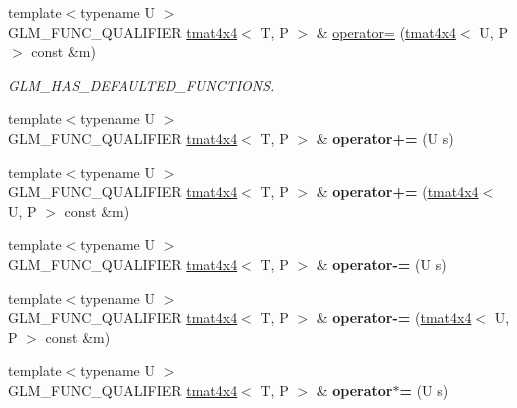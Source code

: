 \begin{DoxyCompactItemize}
{\footnotesize template$<$typename U $>$ }\\G\+L\+M\+\_\+\+F\+U\+N\+C\+\_\+\+Q\+U\+A\+L\+I\+F\+I\+ER \hyperlink{structglm_1_1tmat4x4}{tmat4x4}$<$ T, P $>$ \& \hyperlink{structglm_1_1tmat4x4_a967c1c1711875b670d5a325d86566209}{operator=} (\hyperlink{structglm_1_1tmat4x4}{tmat4x4}$<$ U, P $>$ const \&m)
\begin{DoxyCompactList}\small\item\em G\+L\+M\+\_\+\+H\+A\+S\+\_\+\+D\+E\+F\+A\+U\+L\+T\+E\+D\+\_\+\+F\+U\+N\+C\+T\+I\+O\+NS. \end{DoxyCompactList}\item 
\mbox{\label{structglm_1_1tmat4x4_aef40b6c6931ba950e9414bc82e5ee0ed}} 
{\footnotesize template$<$typename U $>$ }\\G\+L\+M\+\_\+\+F\+U\+N\+C\+\_\+\+Q\+U\+A\+L\+I\+F\+I\+ER \hyperlink{structglm_1_1tmat4x4}{tmat4x4}$<$ T, P $>$ \& {\bfseries operator+=} (U s)
\item 
\mbox{\label{structglm_1_1tmat4x4_a6d28df7c71f90ad3c2d021e9e11eff4a}} 
{\footnotesize template$<$typename U $>$ }\\G\+L\+M\+\_\+\+F\+U\+N\+C\+\_\+\+Q\+U\+A\+L\+I\+F\+I\+ER \hyperlink{structglm_1_1tmat4x4}{tmat4x4}$<$ T, P $>$ \& {\bfseries operator+=} (\hyperlink{structglm_1_1tmat4x4}{tmat4x4}$<$ U, P $>$ const \&m)
\item 
\mbox{\label{structglm_1_1tmat4x4_a70738b22e55ed76f5283241440f5e5ab}} 
{\footnotesize template$<$typename U $>$ }\\G\+L\+M\+\_\+\+F\+U\+N\+C\+\_\+\+Q\+U\+A\+L\+I\+F\+I\+ER \hyperlink{structglm_1_1tmat4x4}{tmat4x4}$<$ T, P $>$ \& {\bfseries operator-\/=} (U s)
\item 
\mbox{\label{structglm_1_1tmat4x4_a3162224a5aa306caa17ce2de9b2050cc}} 
{\footnotesize template$<$typename U $>$ }\\G\+L\+M\+\_\+\+F\+U\+N\+C\+\_\+\+Q\+U\+A\+L\+I\+F\+I\+ER \hyperlink{structglm_1_1tmat4x4}{tmat4x4}$<$ T, P $>$ \& {\bfseries operator-\/=} (\hyperlink{structglm_1_1tmat4x4}{tmat4x4}$<$ U, P $>$ const \&m)
\item 
\mbox{\label{structglm_1_1tmat4x4_a2356a940d6d70f2571516f8111d22b02}} 
{\footnotesize template$<$typename U $>$ }\\G\+L\+M\+\_\+\+F\+U\+N\+C\+\_\+\+Q\+U\+A\+L\+I\+F\+I\+ER \hyperlink{structglm_1_1tmat4x4}{tmat4x4}$<$ T, P $>$ \& {\bfseries operator$\ast$=} (U s)

\end{DoxyCompactItemize}
